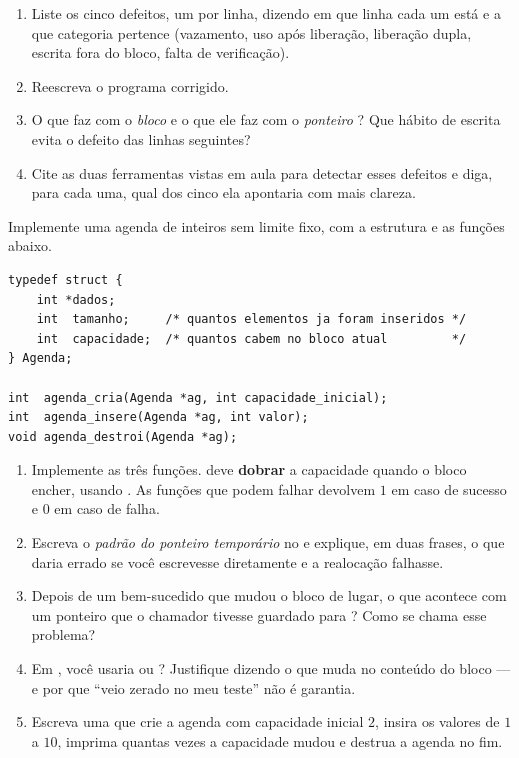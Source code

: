 \documentclass[11pt,a4paper]{article}
\begin{document}
\begin{enumerate}[label=(\alph*),leftmargin=1.8em,itemsep=1pt]
  \item Liste os cinco defeitos, um por linha, dizendo em que linha cada um está e a
        que categoria pertence (vazamento, uso após liberação, liberação dupla,
        escrita fora do bloco, falta de verificação).
  \item Reescreva o programa corrigido.
  \item O que  faz com o \emph{bloco} e o que ele faz com o \emph{ponteiro}
        ? Que hábito de escrita evita o defeito das linhas seguintes?
  \item Cite as duas ferramentas vistas em aula para detectar esses defeitos e diga,
        para cada uma, qual dos cinco ela apontaria com mais clareza.
\end{enumerate}

Implemente uma agenda de inteiros sem limite fixo, com a estrutura e as funções
abaixo.

\begin{lstlisting}
typedef struct {
    int *dados;
    int  tamanho;     /* quantos elementos ja foram inseridos */
    int  capacidade;  /* quantos cabem no bloco atual         */
} Agenda;

int  agenda_cria(Agenda *ag, int capacidade_inicial);
int  agenda_insere(Agenda *ag, int valor);
void agenda_destroi(Agenda *ag);
\end{lstlisting}

\begin{enumerate}[label=(\alph*),leftmargin=1.8em,itemsep=1pt]
  \item Implemente as três funções.  deve \textbf{dobrar} a
        capacidade quando o bloco encher, usando . As funções que podem
        falhar devolvem $1$ em caso de sucesso e $0$ em caso de falha.
  \item Escreva o \emph{padrão do ponteiro temporário} no  e explique, em
        duas frases, o que daria errado se você escrevesse
         diretamente e a realocação falhasse.
  \item Depois de um  bem-sucedido que mudou o bloco de lugar, o que
        acontece com um ponteiro que o chamador tivesse guardado para
        ? Como se chama esse problema?
  \item Em , você usaria  ou ? Justifique
        dizendo o que muda no conteúdo do bloco --- e por que ``veio zerado no meu
        teste'' não é garantia.
  \item Escreva uma  que crie a agenda com capacidade inicial $2$, insira os
        valores de $1$ a $10$, imprima quantas vezes a capacidade mudou e destrua a
        agenda no fim.
\end{enumerate}
\end{document}
